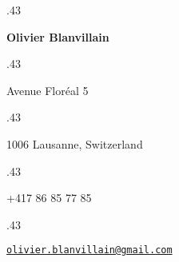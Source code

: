 \documentclass[margin]{res}
\newcommand{\centered}[1]{\moveleft.43\hoffset\centerline{#1}}
\begin{document}
\centered{\LARGE\textbf{Olivier Blanvillain}}
\vspace{3pt}

\centered{Avenue Floréal 5}
\centered{1006 Lausanne, Switzerland}
\vspace{3pt}
\centered{+417 86 85 77 85}
\vspace{2pt}
\centered{\href{mailto:olivier.blanvillain@gmail.com}{\texttt{olivier.blanvillain@gmail.com}}}

\begin{resume}
  
\end{resume}
\end{document}
